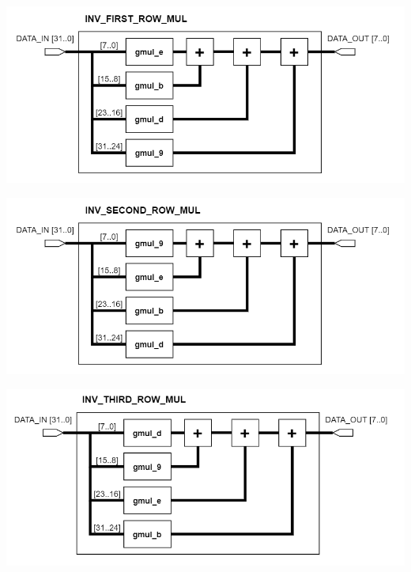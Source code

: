 \documentclass[a4paper, 10pt]{article}
\newenvironment{Figure}
    {\par\medskip\noindent\minipage{\linewidth}}
    {\endminipage\par\medskip}
\begin{document}
\begin{multicols}{2}
	\noindent
            \begin{Figure}
                \centering
                \includegraphics[width=\linewidth]{InvMixColumns-Inv_First_Row_Mul.png}
                \label{fig:invfirstrowmul}
            \end{Figure}

	\noindent
            \begin{Figure}
                \centering
                \includegraphics[width=\linewidth]{InvMixColumns-Inv_Second_Row_Mul.png}
                \label{fig:invsecondrowmul}
            \end{Figure}

	\noindent
            \begin{Figure}
                \centering
                \includegraphics[width=\linewidth]{InvMixColumns-Inv_Third_Row_Mul.png}
                \label{fig:invthirdrowmul}
            \end{Figure}


\end{multicols}
\end{document}
